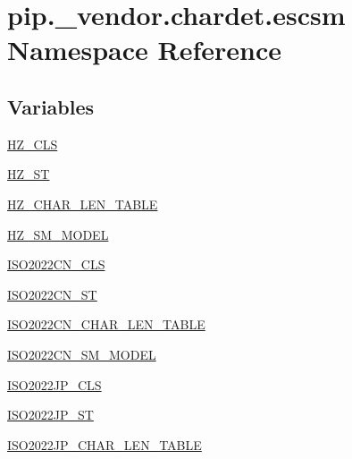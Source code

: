 \hypertarget{namespacepip_1_1__vendor_1_1chardet_1_1escsm}{}\section{pip.\+\_\+vendor.\+chardet.\+escsm Namespace Reference}
\label{namespacepip_1_1__vendor_1_1chardet_1_1escsm}
\subsection*{Variables}
\begin{DoxyCompactItemize}
\item 
\hyperlink{namespacepip_1_1__vendor_1_1chardet_1_1escsm_aea0c9d3ce5082af8a115a30ec60c4a71}{H\+Z\+\_\+\+C\+LS}
\item 
\hyperlink{namespacepip_1_1__vendor_1_1chardet_1_1escsm_a9e49328d688ed320dda747d8a2df0042}{H\+Z\+\_\+\+ST}
\item 
\hyperlink{namespacepip_1_1__vendor_1_1chardet_1_1escsm_a10f7ae6bcecc7eed0aa7a3d23855688f}{H\+Z\+\_\+\+C\+H\+A\+R\+\_\+\+L\+E\+N\+\_\+\+T\+A\+B\+LE}
\item 
\hyperlink{namespacepip_1_1__vendor_1_1chardet_1_1escsm_a48ee8da90b1569a5970ee019c1b0719a}{H\+Z\+\_\+\+S\+M\+\_\+\+M\+O\+D\+EL}
\item 
\hyperlink{namespacepip_1_1__vendor_1_1chardet_1_1escsm_a6213d2f66bba637c84c5b5cbb98aa293}{I\+S\+O2022\+C\+N\+\_\+\+C\+LS}
\item 
\hyperlink{namespacepip_1_1__vendor_1_1chardet_1_1escsm_a9a381843dc4febbeda9c5b8b5d0256de}{I\+S\+O2022\+C\+N\+\_\+\+ST}
\item 
\hyperlink{namespacepip_1_1__vendor_1_1chardet_1_1escsm_aa37043bdf38a9499784a89910c5953c1}{I\+S\+O2022\+C\+N\+\_\+\+C\+H\+A\+R\+\_\+\+L\+E\+N\+\_\+\+T\+A\+B\+LE}
\item 
\hyperlink{namespacepip_1_1__vendor_1_1chardet_1_1escsm_a051d1c30ab3d1b5faf65fa952a94dd80}{I\+S\+O2022\+C\+N\+\_\+\+S\+M\+\_\+\+M\+O\+D\+EL}
\item 
\hyperlink{namespacepip_1_1__vendor_1_1chardet_1_1escsm_a9b468fa3033bc2d9715bccddffeffa08}{I\+S\+O2022\+J\+P\+\_\+\+C\+LS}
\item 
\hyperlink{namespacepip_1_1__vendor_1_1chardet_1_1escsm_a2653ea37991ee361865bd61ba051358c}{I\+S\+O2022\+J\+P\+\_\+\+ST}
\item 
\hyperlink{namespacepip_1_1__vendor_1_1chardet_1_1escsm_a70cbcc611dbe1c4ad85c3889c190bdd9}{I\+S\+O2022\+J\+P\+\_\+\+C\+H\+A\+R\+\_\+\+L\+E\+N\+\_\+\+T\+A\+B\+LE}

\end{DoxyCompactItemize}
